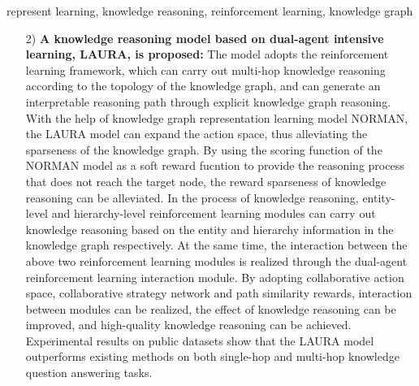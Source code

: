 \documentclass[algorithmlist, AutoFakeBold, AutoFakeSlant, figurelist, tablelist, nomlist, engineering]{seuthesix}
\begin{document}
\begin{englishabstract}{represent learning, knowledge reasoning, reinforcement learning, knowledge graph}
\begin{itemize}
    Then, the causal inference module is used to construct a causal graph of the graph neural network module, and the method of causal intervention of neighborhood information is adopted to comprehensively consider a variety of factors such as hierarchical difference score, decision difference score, predictive confidence score and inference distance score to evaluate whether the current node receives information from the neighborhood nodes and improve stability of the model.
    At the same time, through the graph neural network module, the results of the hierarchical information extraction module is used as the auxiliary, and the causal inference module is used to evaluate whether to receive neighborhood information. 
    The completed training model can convert the input knowledge triples into the knowledge graph representation vectors and can be used for the tasks of knowledge reasoning.
    Experimental results on public datasets show that the NORMAN model outperforms existing methods on knowledge graph completion tasks.
    \item [2)]\textbf{A knowledge reasoning model based on dual-agent intensive learning, LAURA, is proposed:}
    The model adopts the reinforcement learning framework, which can carry out multi-hop knowledge reasoning according to the topology of the knowledge graph, and can generate an interpretable reasoning path through explicit knowledge graph reasoning.
    With the help of knowledge graph representation learning model NORMAN, the LAURA model can expand the action space, thus alleviating the sparseness of the knowledge graph. 
    By using the scoring function of the NORMAN model as a soft reward fucntion to provide the reasoning process that does not reach the target node, the reward sparseness of knowledge reasoning can be alleviated.
    In the process of knowledge reasoning, entity-level and hierarchy-level reinforcement learning modules can carry out knowledge reasoning based on the entity and hierarchy information in the knowledge graph respectively.
    At the same time, the interaction between the above two reinforcement learning modules is realized through the dual-agent reinforcement learning interaction module. By adopting collaborative action space, collaborative strategy network and path similarity rewards, interaction between modules can be realized, the effect of knowledge reasoning can be improved, and high-quality knowledge reasoning can be achieved.
    Experimental results on public datasets show that the LAURA model outperforms existing methods on both single-hop and multi-hop knowledge question answering tasks.
  \end{itemize}
\end{englishabstract} 
\end{document}
